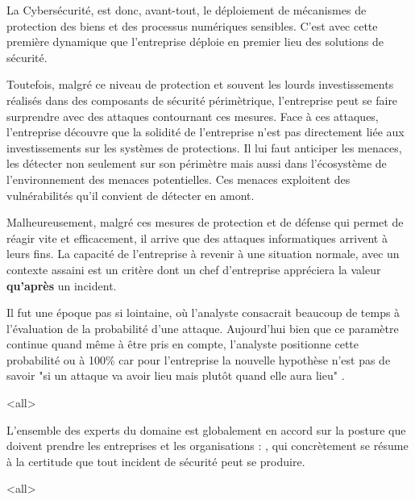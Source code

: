 La Cybersécurité, est donc, avant-tout, le déploiement de mécanismes de protection des biens et des processus numériques sensibles. C’est avec cette première dynamique que l’entreprise déploie en premier lieu des solutions de sécurité. 

Toutefois, malgré ce niveau de protection et souvent les lourds investissements réalisés dans des composants de sécurité périmètrique, l’entreprise peut se faire surprendre avec des attaques contournant ces mesures. Face à ces attaques, l’entreprise découvre que la solidité de l’entreprise n’est pas directement liée aux investissements sur les systèmes de protections. Il lui faut anticiper les menaces, les détecter non seulement sur son périmètre mais aussi dans l’écosystème de l’environnement des menaces potentielles. Ces menaces exploitent des vulnérabilités qu’il convient de détecter en amont.

Malheureusement, malgré ces mesures de protection et de défense qui permet de réagir vite et efficacement, il arrive que des attaques informatiques arrivent à leurs fins. La capacité de l’entreprise à revenir à une situation normale, avec un contexte assaini est un critère dont un chef d’entreprise appréciera la valeur \textbf{qu’après} un incident.


Il fut une époque pas si lointaine, où l'analyste consacrait beaucoup de temps à l'évaluation de la probabilité d'une attaque. Aujourd'hui bien que ce paramètre continue quand même à être pris en compte, l'analyste positionne cette probabilité ou 
 à 100\% car pour l'entreprise la nouvelle hypothèse n'est pas de savoir "si un attaque va avoir lieu mais plutôt quand elle aura lieu" .



\mode<all>{}

L'ensemble des experts du domaine est globalement en accord sur la posture que doivent prendre les entreprises et les organisations : , qui concrètement se résume à la certitude que tout incident de sécurité peut se produire.

\mode<all>{}

